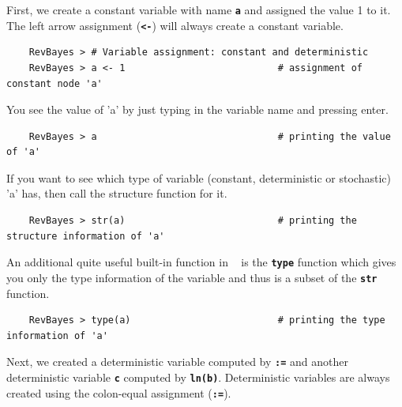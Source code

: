 \documentclass[11pt]{article}
\newcommand{\cl}[1]{{\texttt{\textbf{#1}}}}
\begin{document}
First, we create a constant variable with name \cl{a} and assigned the value 1 to it. 
The left arrow assignment (\cl{<-}) will always create a constant variable.
{\tt \begin{snugshade*}
\begin{lstlisting}    
    RevBayes > # Variable assignment: constant and deterministic
    RevBayes > a <- 1                           # assignment of constant node 'a'
\end{lstlisting}
\end{snugshade*}}
You see the value of 'a' by just typing in the variable name and pressing enter.
{\tt \begin{snugshade*}
\begin{lstlisting}    
    RevBayes > a                                # printing the value of 'a'
\end{lstlisting}
\end{snugshade*}}
If you want to see which type of variable (constant, deterministic or stochastic) 'a' has, then call the structure function for it.
{\tt \begin{snugshade*}
\begin{lstlisting}    
    RevBayes > str(a)                           # printing the structure information of 'a'
\end{lstlisting}
\end{snugshade*}}
An additional quite useful built-in function in \RevBayes~ is the \cl{type} function which gives you only the type information of the variable and thus is a subset of the \cl{str} function.
{\tt \begin{snugshade*}
\begin{lstlisting}    
    RevBayes > type(a)                          # printing the type information of 'a'
\end{lstlisting}
\end{snugshade*}}

Next, we created a deterministic variable computed by \cl{:=} and another deterministic variable \cl{c} computed by \cl{ln(b)}. 
Deterministic variables are always created using the colon-equal assignment (\cl{:=}). 
\end{document}
